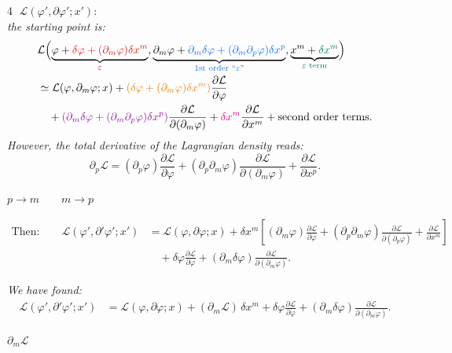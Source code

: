 \documentclass[11pt,a4paper]{article}
\newcommand{\rednote}[1]{\textcolor{noteRed}{#1}}
\newcommand{\bluenote}[1]{\textcolor{noteBlue}{#1}}
\newcommand{\greennote}[1]{\textcolor{noteGreen}{#1}}
\newcommand{\orangenote}[1]{\textcolor{noteOrange}{#1}}
\newcommand{\purplenote}[1]{\textcolor{notePurple}{#1}}
\begin{document}
\textcircled{4} \;$\mathcal L(\varphi',\partial\varphi';x')$:\\[2pt]
\textit{the starting point is:}
\[
\begin{aligned}
&\mathcal L\Bigl(\underbrace{\varphi+\rednote{\delta\varphi+(\partial_m\varphi)\delta x^m}}_{\rednote{\varepsilon}},
\underbrace{\partial_m\varphi+\bluenote{\partial_m\delta\varphi+(\partial_m\partial_p\varphi)\delta x^p}}_{\bluenote{\text{1st order ``}\varepsilon\text{''}}},
\underbrace{x^m+\greennote{\delta x^m}}_{\greennote{\varepsilon\text{ term}}}\Bigr)\\
&\simeq \mathcal L(\varphi,\partial_m\varphi;x)
+\orangenote{\left(\delta\varphi+(\partial_m\varphi)\delta x^m\right)}\frac{\partial\mathcal L}{\partial\varphi}\\
&\quad+\purplenote{\left(\partial_m\delta\varphi+(\partial_m\partial_p\varphi)\delta x^p\right)}
 \frac{\partial\mathcal L}{\partial(\partial_m\varphi)}
+\textcolor{magenta}{\delta x^m}\frac{\partial\mathcal L}{\partial x^m}
+\text{second order terms}.
\end{aligned}
\]
\textit{However, the total derivative of the Lagrangian density reads:}
\[
\partial_p\mathcal L
=(\partial_p\varphi)\frac{\partial\mathcal L}{\partial\varphi}
+(\partial_p\partial_m\varphi)\frac{\partial\mathcal L}{\partial(\partial_m\varphi)}
+\frac{\partial\mathcal L}{\partial x^p}.
\]
\begin{center}\rednote{$p\to m\qquad m\to p$}\end{center}
\[
\begin{aligned}
\text{Then:}\qquad
\mathcal L(\varphi',\partial'\varphi';x')
&=\mathcal L(\varphi,\partial\varphi;x)
+\delta x^m\left[(\partial_m\varphi)\frac{\partial\mathcal L}{\partial\varphi}
+(\partial_p\partial_m\varphi)\frac{\partial\mathcal L}{\partial(\partial_p\varphi)}
+\frac{\partial\mathcal L}{\partial x^m}\right]\\
&\quad+\delta\varphi\frac{\partial\mathcal L}{\partial\varphi}
+(\partial_m\delta\varphi)\frac{\partial\mathcal L}{\partial(\partial_m\varphi)}.
\end{aligned}
\]

\textit{We have found:}
\[
\begin{aligned}
\mathcal L(\varphi',\partial'\varphi';x')
&=\mathcal L(\varphi,\partial\varphi;x)
+(\partial_m\mathcal L)\,\delta x^m
+\delta\varphi\frac{\partial\mathcal L}{\partial\varphi}
+(\partial_m\delta\varphi)\frac{\partial\mathcal L}{\partial(\partial_m\varphi)}.
\end{aligned}
\]
\begin{center}\rednote{$\partial_m\mathcal L$}\end{center}
\end{document}
